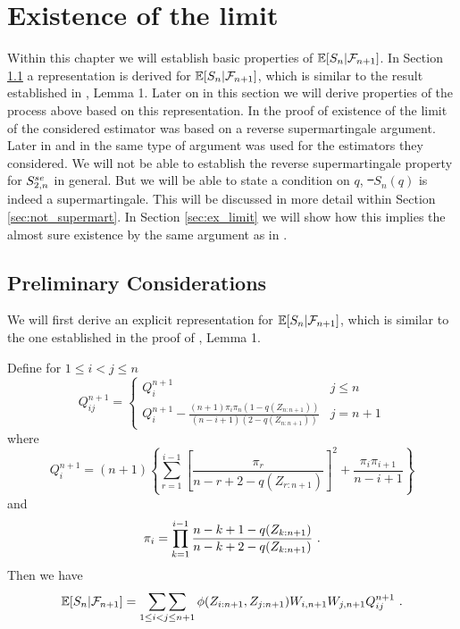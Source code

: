 \chapter{Existence of the limit}

Within this chapter we will establish basic properties of $\mathbb{E}[S_n|\mathcal{F}_{n+1}]$. In Section \ref{sec:representation} a representation is derived for $\mathbb{E}[S_n|\mathcal{F}_{n+1}]$, which is similar to the result established in \cite{bose1999strong}, Lemma 1. Later on in this section we will derive properties of the process above based on this representation. In \cite{stute1993strong} the proof of existence of the limit of the considered estimator was based on a reverse supermartingale argument. Later in \cite{dikta2000strong} and in \cite{bose1999strong} the same type of argument was used for the estimators they considered. We will not be able to establish the reverse supermartingale property for $S_{2,n}^{se}$ in general. But we will be able to state a condition on $q$, \st\ $S_n(q)$ is indeed a supermartingale. This will be discussed in more detail within Section \ref{sec:not_supermart}. In Section \ref{sec:ex_limit} we will show how this implies the almost sure existence by the same argument as in \cite{stute1993strong}.
%
%
%
\section{Preliminary Considerations} \label{sec:representation}
%
We will first derive an explicit representation for $\mathbb{E}[S_{n}|\mathcal{F}_{n+1}]$, which is similar to the one established in the proof of \cite{bose1999strong}, Lemma 1.
\begin{lemma} \label{lem:qi}
Define for $1\leq i<j\leq n$
\[Q_{ij}^{n+1} = \begin{cases} 
      Q_i^{n+1} & j\leq n \\
      Q_i^{n+1} - \frac{(n+1)\pi_i \pi_n (1-q(Z_{n:n+1}))}{(n-i+1)(2-q(Z_{n:n+1}))} & j=n+1
   \end{cases}
\]
%
where
\begin{equation}
	Q_i^{n+1} = (n+1) \left\{ \sum\limits_{r=1}^{i-1} \left[ \frac{\pi_r}{n-r+2-q(Z_{r:n+1})} \right]^2 + \frac{\pi_i\pi_{i+1}}{n-i+1} \right\}
	\label{eq:qi}
\end{equation}
and 
$$\pi_i = \prod\limits_{k=1}^{i-1} \frac{n-k+1-q(Z_{k:n+1})}{n-k+2-q(Z_{k:n+1})}\textrm{ .}$$
Then we have
$$\mathbb{E}[S_{n}|\mathcal{F}_{n+1}] = \mathop{\sum\sum}\limits_{1\leq i<j \leq n+1} \phi(Z_{i:n+1},Z_{j:n+1}) W_{i,n+1}W_{j,n+1}Q_{ij}^{n+1}\textrm{ .}$$
\end{lemma}

